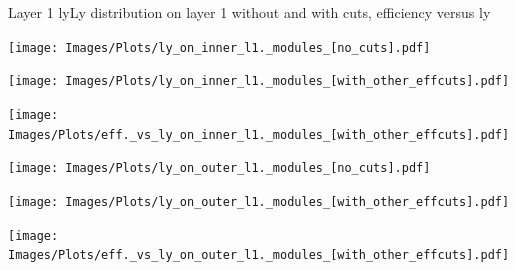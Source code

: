 \documentclass{beamer}
\begin{document}
\begin{frame}{Layer 1 ly}{Ly distribution on layer 1 without and with cuts, efficiency versus ly}
\begin{minipage}{0.32\textwidth}
  \centering
  \texttt{[image: Images/Plots/ly\_on\_inner\_l1.\_modules\_[no\_cuts].pdf]}
\end{minipage}%
\hspace{0.01\textwidth}%
\begin{minipage}{0.32\textwidth}
  \centering
  \texttt{[image: Images/Plots/ly\_on\_inner\_l1.\_modules\_[with\_other\_effcuts].pdf]}
\end{minipage}%
\hspace{0.01\textwidth}%
\begin{minipage}{0.32\textwidth}
  \centering
  \texttt{[image: Images/Plots/eff.\_vs\_ly\_on\_inner\_l1.\_modules\_[with\_other\_effcuts].pdf]}
\end{minipage}
\begin{minipage}{0.32\textwidth}
  \centering
  \texttt{[image: Images/Plots/ly\_on\_outer\_l1.\_modules\_[no\_cuts].pdf]}
\end{minipage}%
\hspace{0.01\textwidth}%
\begin{minipage}{0.32\textwidth}
  \centering
  \texttt{[image: Images/Plots/ly\_on\_outer\_l1.\_modules\_[with\_other\_effcuts].pdf]}
\end{minipage}%
\hspace{0.01\textwidth}%
\begin{minipage}{0.32\textwidth}
  \centering
  \texttt{[image: Images/Plots/eff.\_vs\_ly\_on\_outer\_l1.\_modules\_[with\_other\_effcuts].pdf]}
\end{minipage}
\end{frame}
\end{document}
